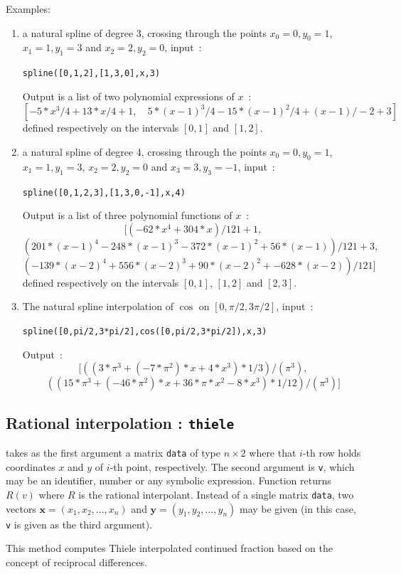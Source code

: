 \documentclass[a4paper,11pt]{book}
\begin{document}
Examples:
\begin{enumerate}
\item a natural spline of degree 3, crossing through the points 
$x_0=0,y_0=1$, $x_1=1,y_1=3$ and  $x_2=2, y_2=0$, input~:
\begin{center}
{\tt spline([0,1,2],[1,3,0],x,3)}
\end{center}
Output is a list of two polynomial expressions of $x$~:
\[[ -5*x^3/4+13*x/4+1, \quad 5*(x-1)^3/4-15*(x-1)^2/4+(x-1)/-2+3 ]\]
defined respectively on the intervals $[0,1]$ and  $[1,2]$.
\item a natural spline of degree 4, crossing through the points 
$x_0=0,y_0=1$, $x_1=1,y_1=3$, $x_2=2, y_2=0$ and  $x_3=3, y_3=-1$, 
input~:
\begin{center}
{\tt spline([0,1,2,3],[1,3,0,-1],x,4)}
\end{center}
Output is a list of three polynomial functions of $x$~:
\[ [(-62*x^4+304*x)/121+1,\] 
\[(201*(x-1)^4-248*(x-1)^3-372*(x-1)^2+56*(x-1))/121+3,\] 
\[(-139*(x-2)^4+556*(x-2)^3+90*(x-2)^2+-628*(x-2))/121]\]
defined respectively on the intervals $[0,1]$, $[1,2]$ and  $[2,3]$.
\item The natural spline interpolation of $\cos$ on 
$[0,\pi/2,3\pi/2]$, input~:
\begin{center}
{\tt spline([0,pi/2,3*pi/2],cos([0,pi/2,3*pi/2]),x,3)}
\end{center}
Output~:
\[
[((3*\pi^3+(-7*\pi^2)*x+4*x^3)*1/3)/(\pi^3),\]
\[((15*\pi^3+(-46*\pi^2)*x+36*\pi*x^2-8*x^3)*1/12)/(\pi^3)]
\]
\end{enumerate}

\subsection{Rational interpolation : {\tt thiele}}
 takes as the first argument a matrix {\tt data} of type $ n\times 2 $ where that $ i $-th row holds coordinates $ x $ and $ y $ of $ i $-th point, respectively. The second argument is {\tt v}, which may be an identifier, number or any symbolic expression. Function returns $ R(v) $ where $ R $ is the rational interpolant. Instead of a single matrix {\tt data}, two vectors $ \mathbf{x}=(x_1,x_2,\dots,x_n) $ and $ \mathbf{y}=(y_1,y_2,\dots,y_n) $ may be given (in this case, {\tt v} is given as the third argument).

This method computes Thiele interpolated continued fraction based on the concept of reciprocal differences.
\end{document}
